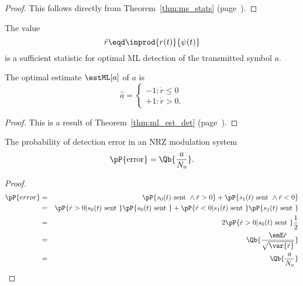 \begin{proof}
This follows directly from 
Theorem~\ref{thm:ms_stats} (page~\pageref{thm:ms_stats}).
\end{proof}


\begin{proposition}
The value
\[  \dot{r} \eqd \inprod{r(t)}{\psi(t)} \]
is a sufficient statistic for optimal ML detection of the transmitted 
symbol $a$.

The optimal estimate $\estML[a]$ of $a$ is
\[
   \hat{a} = \left\{
     \begin{array}{ll}
        -1 : \dot{r}\le 0 \\
        +1 : \dot{r}>   0.
     \end{array}
     \right.
\]
\end{proposition}

\begin{proof}
   This is a result of Theorem~\ref{thm:ml_est_det} (page~\pageref{thm:ml_est_det}).
\end{proof}

\begin{proposition}
The probability of detection error in an NRZ modulation system
   \[ \pP{\mbox{error}} = \Qb{\frac{a}{N_o}}.\]
\end{proposition}

\begin{proof}
\begin{eqnarray*}
   \pP{error}
     &=& \pP{s_0(t) \mbox{ sent } \land \dot{r}>0 } +
         \pP{s_1(t) \mbox{ sent } \land \dot{r}<0 } 
   \\&=& \pP{\dot{r}>0 | s_0(t) \mbox{ sent }}\pP{s_0(t) \mbox{ sent } } +
         \pP{\dot{r}<0 | s_1(t) \mbox{ sent }}\pP{s_1(t) \mbox{ sent } } 
   \\&=& 2\pP{\dot{r}>0 | s_0(t) \mbox{ sent }}\frac{1}{2}
   \\&=& \Qb{ \frac{\emE\dot{r}}{\sqrt{\var{\dot{r}}}}}
   \\&=& \Qb{\frac{a}{N_o}}
\end{eqnarray*}
\end{proof}






